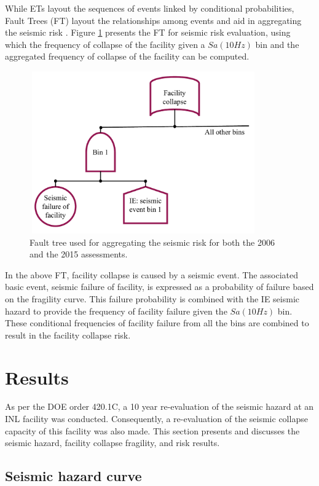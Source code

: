 \documentclass[3p]{elsarticle}
\begin{document}
While ETs layout the sequences of events linked by conditional probabilities, Fault Trees (FT) layout the relationships among events and aid in aggregating the seismic risk \cite{Pate1984}. Figure \ref{fig:FT} presents the FT for seismic risk evaluation, using which the frequency of collapse of the facility given a $Sa(10Hz)$ bin and the aggregated frequency of collapse of the facility can be computed.

\begin{figure}[h]
\centering
\includegraphics[width=3.85in, height = 2.75in]{FT.pdf}
\caption{Fault tree used for aggregating the seismic risk for both the 2006 and the 2015 assessments.}\label{fig:FT}
\end{figure}

\noindent In the above FT, facility collapse is caused by a seismic event. The associated basic event, seismic failure of facility, is expressed as a probability of failure based on the fragility curve. This failure probability is combined with the IE seismic hazard to provide the frequency of facility failure given the $Sa(10Hz)$ bin. These conditional frequencies of facility failure from all the bins are combined to result in the facility collapse risk.

\section{Results}

As per the DOE order 420.1C, a 10 year re-evaluation of the seismic hazard at an INL facility was conducted. Consequently, a re-evaluation of the seismic collapse capacity of this facility was also made. This section presents and discusses the seismic hazard, facility collapse fragility, and risk results.

\subsection{Seismic hazard curve}\label{res_haz}
\end{document}
